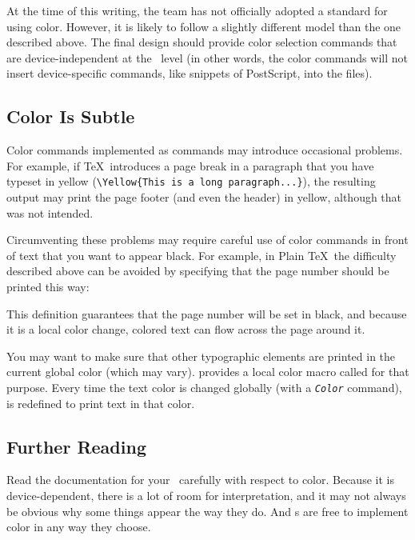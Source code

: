 At the time of this writing, 
the \LaTeXe{} team has 
not officially adopted a
standard for using color.  However, it is likely to follow a slightly
different model than the one described above.  The final design should provide
color selection commands that are device-independent at the \dvidriver\
level (in other words, the color commands will not insert device-specific
commands, like snippets of PostScript, into the \ext{DVI} files).

\subsection{Color Is Subtle}

Color commands implemented as  commands may introduce
occasional problems.  For example, if \TeX\ introduces a page break in
a paragraph that you have typeset in yellow 
(\verb|\Yellow{This is a long paragraph...}|), 
the resulting output may print the page footer
(and even the header) in yellow, although that was not intended.

Circumventing these problems may require careful use of color commands
in front of text that you want to appear black.  For example, in Plain 
\TeX\ the difficulty described above can be avoided by specifying that
the page number should be printed this way:

\begin{shortexample}
\footline{\Black{\hss\tenrm\folio\hss}}
\end{shortexample}

\newpage
This definition guarantees that the page number will be set in black,
and because it is a local color change, colored text can flow across the
page around it.

You may want to make sure that other typographic elements are printed in the
current global color (which may vary).  \program{dvips} provides a 
local color macro called \cs{globalColor} for that purpose.  Every
time the text color is changed globally (with a 
\texttt{\textit{Color}} command), 
 is redefined to print text in that color.

\subsection{Further Reading}

Read the documentation for your \dvidriver\ carefully with respect to
color.  Because it is device-dependent, there is a lot of room for
interpretation, and it may not always be obvious why some things appear
the way they do.  And \dvidriver{}s are free to implement color in any
way they choose.

